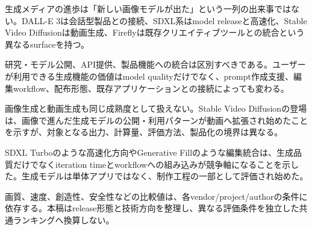 
生成メディアの進歩は「新しい画像モデルが出た」という一列の出来事ではない。DALL-E 3は会話型製品との接続、SDXL系はmodel releaseと高速化、Stable Video Diffusionは動画生成、Fireflyは既存クリエイティブツールとの統合という異なるsurfaceを持つ。\autocite{src-091bbe9dbf4e,src-096341c0ccf6,src-0b410c70bfc7,src-18f22707bf78,src-2b694ab9a461,src-2c97fc5583a3,src-317afaba6510,src-9bc8e7751f80,src-9da0d929aa45,src-a4f61fbe35c5,src-ba80e5e27a11,src-e79065444906}


研究・モデル公開、API提供、製品機能への統合は区別すべきである。ユーザーが利用できる生成機能の価値はmodel qualityだけでなく、prompt作成支援、編集workflow、配布形態、既存アプリケーションとの接続によっても変わる。\autocite{src-091bbe9dbf4e,src-18f22707bf78,src-2b694ab9a461,src-317afaba6510,src-9bc8e7751f80,src-9da0d929aa45,src-a4f61fbe35c5,src-ba80e5e27a11,src-e79065444906}


画像生成と動画生成も同じ成熟度として扱えない。Stable Video Diffusionの登場は、画像で進んだ生成モデルの公開・利用パターンが動画へ拡張され始めたことを示すが、対象となる出力、計算量、評価方法、製品化の境界は異なる。\autocite{src-091bbe9dbf4e,src-096341c0ccf6,src-0b410c70bfc7,src-18f22707bf78,src-2c97fc5583a3,src-317afaba6510,src-9da0d929aa45,src-e79065444906}


SDXL Turboのような高速化方向やGenerative Fillのような編集統合は、生成品質だけでなくiteration timeとworkflowへの組み込みが競争軸になることを示した。生成モデルは単体アプリではなく、制作工程の一部として評価され始めた。\autocite{src-091bbe9dbf4e,src-18f22707bf78,src-2b694ab9a461,src-317afaba6510,src-9da0d929aa45,src-a4f61fbe35c5,src-e79065444906}


\begin{claimboundary}
画質、速度、創造性、安全性などの比較値は、各vendor/project/authorの条件に依存する。本稿はrelease形態と技術方向を整理し、異なる評価条件を独立した共通ランキングへ換算しない。\autocite{src-9bc8e7751f80,src-ba80e5e27a11}
\end{claimboundary}
